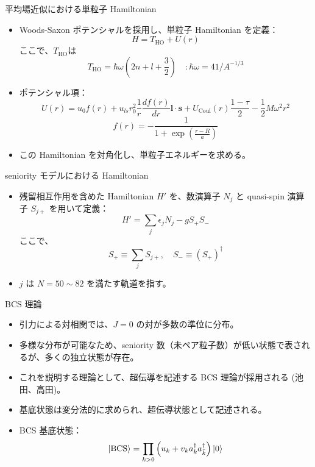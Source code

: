 \documentclass[aspectratio=169, 12pt, dvipdfmx]{beamer}
\begin{document}
\begin{frame}{平均場近似における単粒子 Hamiltonian}
  \begin{itemize}
    \item Woods-Saxon ポテンシャルを採用し、単粒子 Hamiltonian を定義：
      \[
      H = T_{\text{HO}} + U(r)
      \]
      ここで、\(T_{\text{HO}}\)は  
      \[
      T_{\text{HO}} = \hbar \omega \left( 2n + l + \frac{3}{2} \right)\quad:\hbar\omega=41/A^{-1/3}
      \]
    \item ポテンシャル項：
      \[
      U(r) = u_0 f(r) + u_{ls} r_0^2 \frac{1}{r} \frac{df(r)}{dr} \boldsymbol{l} \cdot \boldsymbol{s}
      + U_{\text{Coul}}(r) \frac{1 - \tau}{2}-\frac{1}{2}M\omega^2r^2
      \]
      \[
      f(r) = -\frac{1}{1 + \exp \left( \frac{r - R}{a} \right)}
      \]
    \item この Hamiltonian を対角化し、単粒子エネルギーを求める。
  \end{itemize}
\end{frame}


\begin{frame}{seniority モデルにおける Hamiltonian}
  \begin{itemize}
    \item 残留相互作用を含めた Hamiltonian \( H' \) を、数演算子 \( N_j \) と quasi-spin 演算子 \( S_{j+} \) を用いて定義：
      \[
      H' = \sum_j \epsilon_j N_j - g S_{+} S_{-}
      \]
      ここで、
      \[
      S_{+} \equiv \sum_j S_{j+}, \quad S_{-} \equiv (S_{+})^\dagger
      \]
    \item \( j \) は \( N = 50 \sim 82 \) を満たす軌道を指す。
  \end{itemize}
\end{frame}



\begin{frame}{BCS 理論}
  \begin{itemize}
    \item 引力による対相関では、\( J=0 \) の対が多数の準位に分布。
    \item 多様な分布が可能なため、seniority 数（未ペア粒子数）が低い状態で表されるが、多くの独立状態が存在。
    \item これを説明する理論として、超伝導を記述する BCS 理論が採用される \cite{asakura_structure}(池田、高田)。
    \item 基底状態は変分法的に求められ、超伝導状態として記述される。
    \item BCS 基底状態：
      \[
      \ket{\text{BCS}} = \prod_{k>0} \left( u_k + v_k a^{\dagger}_{k} a^{\dagger}_{\bar{k}} \right) \ket{0}
      \]
  \end{itemize}
\end{frame}
\end{document}
